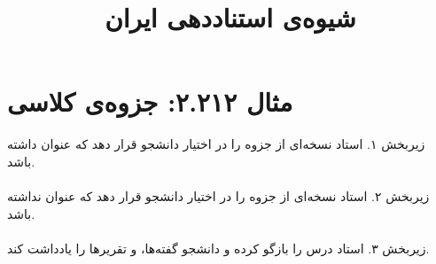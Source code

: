 \documentclass[a4paper,10pt]{article}
\begin{document}
\title{شیوه‌ی استناددهی ایران
 }
\author{}
\date{}
\maketitle



\section*{مثال ۲.۲۱۲: جزوه‌ی کلاسی}

زیربخش ۱. استاد نسخه‌ای از جزوه را در اختیار دانشجو قرار دهد که عنوان داشته باشد.\\
\cite{رضائیان1370الف}\\

زیربخش ۲. استاد نسخه‌ای از جزوه را در اختیار دانشجو قرار دهد که عنوان نداشته باشد.\\
\cite{رضائیان1370ب}\\

زیربخش ۳. استاد درس را بازگو کرده و دانشجو گفته‌ها، و تقریرها را یادداشت کند.\\
\cite{رضائیان1370پ}\\






\end{document}
